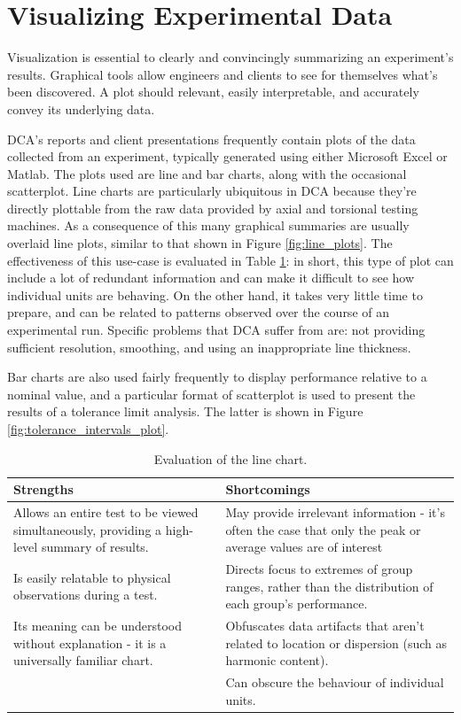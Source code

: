 \documentclass[11pt,a4paper,article]{memoir} %
\begin{document}
\section{Visualizing Experimental Data}
Visualization is essential to clearly and convincingly summarizing an experiment's results. Graphical tools allow engineers and clients to see for themselves what's been discovered. A plot should relevant, easily interpretable, and accurately convey its underlying data.
\par
DCA's reports and client presentations frequently contain plots of the data collected from an experiment, typically generated using either Microsoft Excel or Matlab. The plots used are line and bar charts, along with the occasional scatterplot. Line charts are particularly ubiquitous in DCA because they're directly plottable from the raw data provided by axial and torsional testing machines. As a consequence of this many graphical summaries are usually overlaid line plots, similar to that shown in Figure \ref{fig:line_plots}. The effectiveness of this use-case is evaluated in Table \ref{tab:line_chart}: in short, this type of plot can include a lot of redundant information and can make it difficult to see how individual units are behaving. On the other hand, it takes very little time to prepare, and can be related to patterns observed over the course of an experimental run. Specific problems that DCA suffer from are: not providing sufficient resolution, smoothing, and using an inappropriate line thickness.
\par
Bar charts are also used fairly frequently to display performance relative to a nominal value, and a particular format of scatterplot is used to present the results of a tolerance limit analysis. The latter is shown in Figure \ref{fig:tolerance_intervals_plot}. 
\begin{table}[h!]
\caption{Evaluation of the line chart.}
\small
\hspace*{-.5cm}
\begin{tabular}{p{6.5cm}p{6.5cm}}
\toprule
\textbf{Strengths}	&	\textbf{Shortcomings} \\
\toprule
Allows an entire test to be viewed simultaneously, providing a high-level summary of results.	&	May provide irrelevant information - it's often the case that only the peak or average values are of interest	\\
Is easily relatable to physical observations during a test.	&	Directs focus to extremes of group ranges, rather than the distribution of each group's performance.	\\
Its meaning can be understood without explanation - it is a universally familiar chart.	&  Obfuscates data artifacts that aren't related to location or dispersion (such as harmonic content). \\
&  Can obscure the behaviour of individual units. 			\\
\bottomrule
\end{tabular}
\label{tab:line_chart}
\end{table}
\end{document}
